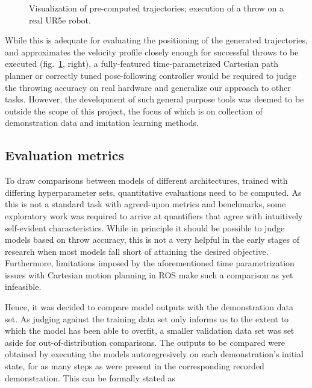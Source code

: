 \documentclass{article}
\begin{document}
\begin{figure}
	\centering
	\caption{Visualization of pre-computed trajectories; execution of a throw on a real UR5e robot.}
	\label{fig:vis_exec}
\end{figure}

While this is adequate for evaluating the positioning of the generated trajectories, and approximates the velocity profile closely enough for successful throws to be executed (fig.~\ref{fig:vis_exec}, right), a fully-featured time-parametrized Cartesian path planner or correctly tuned pose-following controller would be required to judge the throwing accuracy on real hardware and generalize our approach to other tasks. However, the development of such general purpose tools was deemed to be outside the scope of this project, the focus of which is on collection of demonstration data and imitation learning methods.

\subsection{Evaluation metrics}
\label{sec:eval}

To draw comparisons between models of different architectures, trained with differing hyperparameter sets, quantitative evaluations need to be computed. As this is not a standard task with agreed-upon metrics and benchmarks, some exploratory work was required to arrive at quantifiers that agree with intuitively self-evident characteristics. While in principle it should be possible to judge models based on throw accuracy, this is not a very helpful in the early stages of research when most models fall short of attaining the desired objective. Furthermore, limitations imposed by the aforementioned time parametrization issues with Cartesian motion planning in ROS make such a comparison as yet infeasible.

Hence, it was decided to compare model outputs with the demonstration data set. As judging against the training data set only informs us to the extent to which the model has been able to overfit, a smaller validation data set was set aside for out-of-distribution comparisons. The outputs to be compared were obtained by executing the models autoregresively on each demonstration's initial state, for as many steps as were present in the corresponding recorded demonstration. This can be formally stated as
\end{document}
